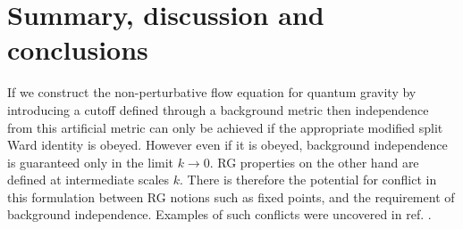 \documentclass[11pt,a4paper]{article}
\numberwithin{figure}{section}
\numberwithin{equation}{section}
\begin{document}
\section{Summary, discussion and conclusions}\label{sec:conclusions}

If we construct the non-perturbative flow equation for quantum gravity by introducing a cutoff defined through a background metric then independence from this artificial metric can only be achieved if the appropriate modified split Ward identity is obeyed. However even if it is obeyed, background independence is guaranteed only in the limit $k\to0$. RG properties on the other hand are defined at intermediate scales $k$. There is therefore the potential for conflict in this formulation between RG notions such as fixed points, and the requirement of background independence. Examples of such conflicts were uncovered in ref. \cite{Dietz:2015owa}.
\end{document}
